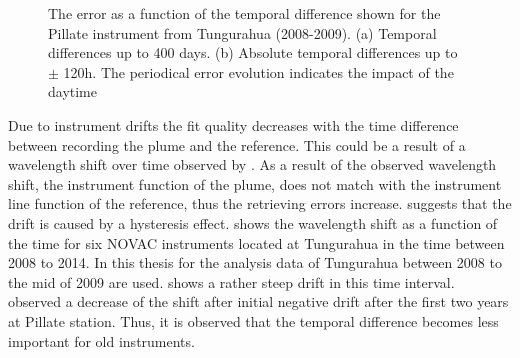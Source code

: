 \begin{figure}
	\caption{The  error as a function of the temporal difference shown for the Pillate instrument from Tungurahua (2008-2009). (a) Temporal differences up to 400 days. (b) Absolute temporal differences up to $\pm$ 120h. The periodical   error evolution indicates the impact of the daytime}
	\label{fig:dat}
\end{figure}
%
Due to instrument drifts the fit quality decreases with the time difference between recording the plume and the reference. This could be a result of a wavelength shift over time observed by \citet{WarnachSimon}. As a result of the observed wavelength shift, the instrument function of the plume, does not match with the instrument line function of the reference, thus the retrieving errors increase. \citet{WarnachSimon} suggests that the drift is caused by a hysteresis effect.  shows the wavelength shift as a function of the time for six NOVAC instruments located at Tungurahua in the time between 2008 to 2014. In this thesis for the analysis data of Tungurahua between 2008 to the mid of 2009 are used.  shows a rather steep drift in this time interval. \citet{WarnachSimon} observed a decrease of the shift after initial negative drift after the first two years at Pillate station. Thus, it is observed that the temporal difference becomes less important for old instruments.\\
